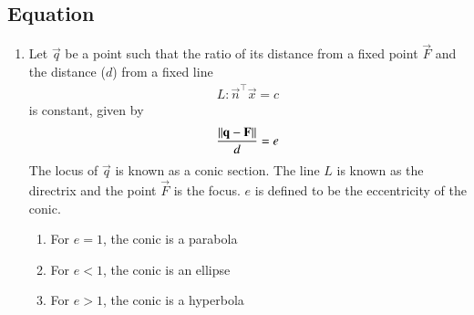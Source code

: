 \subsection{Equation}
\begin{enumerate}[label=\thesubsection.\arabic*.,ref=\thesubsection.\theenumi]
\item
  Let $\vec{q}$ be a point such that the ratio of its distance from a fixed point $\vec{F}$ and the distance ($d$) from a fixed line 
	\begin{align}
L: \vec{n}^{\top}\vec{x}=c 
	\end{align}
		is constant, given by 
\label{conics/30/def}
\begin{align}
\frac{\left\lVert\mathbf{q}-\mathbf{F}\right\rVert}{d} = e    
\end{align}
The locus of $\vec{q}$ is known as a conic section. The line $L$ is known as the directrix and the point $\vec{F}$ is the focus. $e$ is defined to be 
the eccentricity of the conic.  
\begin{enumerate}
    \item For $e = 1$, the conic is a parabola
    \item For $e < 1$, the conic is an ellipse
    \item For $e > 1$, the conic is a hyperbola
\end{enumerate}


\end{enumerate}
